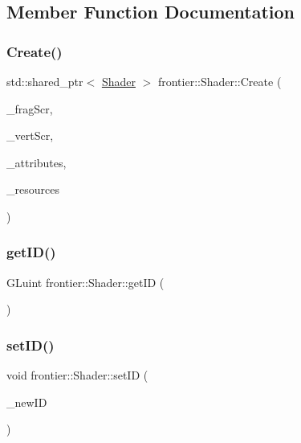 \subsection{Member Function Documentation}
\mbox{\label{classfrontier_1_1_shader_add4c33f617fa62cc1d0757a875bacd01}} 
\subsubsection{\texorpdfstring{Create()}{Create()}}
{\footnotesize\ttfamily std\+::shared\+\_\+ptr$<$ \hyperlink{classfrontier_1_1_shader}{Shader} $>$ frontier\+::\+Shader\+::\+Create (\begin{DoxyParamCaption}\item[{std\+::string}]{\+\_\+frag\+Scr,  }\item[{std\+::string}]{\+\_\+vert\+Scr,  }\item[{std\+::vector$<$ G\+Lchar $\ast$$>$}]{\+\_\+attributes,  }\item[{std\+::shared\+\_\+ptr$<$ \hyperlink{classfrontier_1_1_resources}{Resources} $>$}]{\+\_\+resources }\end{DoxyParamCaption})\hspace{0.3cm}{\ttfamily [static]}}

\mbox{\label{classfrontier_1_1_shader_a85d4e81088393b8cdfcd8d329ad23909}} 
\subsubsection{\texorpdfstring{get\+I\+D()}{getID()}}
{\footnotesize\ttfamily G\+Luint frontier\+::\+Shader\+::get\+ID (\begin{DoxyParamCaption}{ }\end{DoxyParamCaption})}

\mbox{\label{classfrontier_1_1_shader_a0dd496d4f828826d25ece1c02274625e}} 
\subsubsection{\texorpdfstring{set\+I\+D()}{setID()}}
{\footnotesize\ttfamily void frontier\+::\+Shader\+::set\+ID (\begin{DoxyParamCaption}\item[{G\+Luint}]{\+\_\+new\+ID }\end{DoxyParamCaption})}

